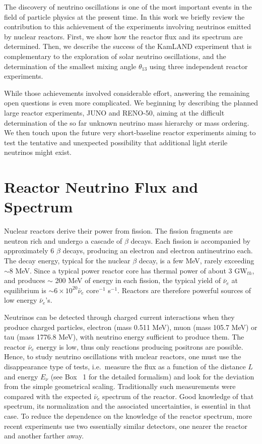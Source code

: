 \documentclass[aps,twocolumn,preprintnumbers,amsmath,superscriptaddress,amssymb,floats,nofootinbib]{revtex4-1}
\begin{document}
The discovery of neutrino oscillations is one of the most important events in the
field of particle physics at the present time. In this work we briefly review the
contribution to this achievement of the experiments involving neutrinos emitted 
by nuclear reactors. First, we show how the reactor flux and its 
spectrum are determined. Then, we describe the success of the 
KamLAND experiment that is complementary to the exploration of solar neutrino 
oscillations, and the determination of the smallest mixing angle 
$\theta_{13}$ using three independent reactor experiments.

While those achievements involved considerable effort, answering the remaining 
open questions is even more complicated. We beginning by describing the planned large reactor experiments, JUNO and RENO-50, aiming at the difficult determination 
of the so far unknown neutrino mass hierarchy or mass ordering.  We then touch upon the future very short-baseline reactor experiments aiming to test the tentative and unexpected 
possibility that additional light sterile neutrinos might exist.

\section{Reactor Neutrino Flux and Spectrum} 
\label{sec:flux}

Nuclear reactors derive their power from fission. The fission fragments are neutron rich and undergo a cascade of $\beta$ decays. 
Each fission is accompanied by approximately 6 $\beta$ decays, producing an electron and electron antineutrino each. 
The decay energy, typical for the nuclear $\beta$ decay, is a few MeV, rarely exceeding $\sim$8 MeV. 
Since a typical power reactor core has thermal power of about 3 GW$_{th}$, and produces
$\sim$ 200 MeV of energy in each fission, the typical yield of $\bar{\nu}_e$ at equilibrium is $\sim 6 \times 10^{20} \bar{\nu}_e$ core$^{-1}$ s$^{-1}$.   
Reactors are therefore powerful sources of low energy $\bar{\nu}_e$'s.

Neutrinos can be detected through charged current interactions when they produce charged particles, electron (mass 0.511 MeV),
muon (mass 105.7 MeV) or tau (mass 1776.8 MeV), with neutrino energy sufficient to
produce them. The reactor $\bar{\nu}_e$ energy is low, thus only reactions producing positrons are possible. Hence, to study neutrino oscillations with nuclear reactors, one must use the disappearance type of tests, i.e.~measure the flux as a function of the distance $L$ and energy $E_{\nu}$ (see Box ~1 for the detailed formalism) and
look for the deviation from the simple geometrical scaling. Traditionally such measurements were compared with the expected  $\bar{\nu}_e$ spectrum
of the reactor. Good knowledge of that spectrum, its normalization and the associated uncertainties, is essential in that case.  
To reduce the dependence on the knowledge of the reactor spectrum, more recent experiments
\cite{Dayabay,Reno} use two essentially similar detectors, one nearer the reactor and another farther away.
\end{document}
